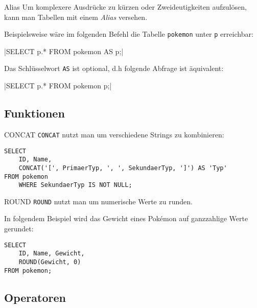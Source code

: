 \begin{bonus}{Alias}
    Um komplexere Ausdrücke zu kürzen oder Zweideutigkeiten aufzulösen, kann man Tabellen mit einem \emph{Alias} versehen.

    Beispielsweise wäre im folgenden Befehl die Tabelle \texttt{pokemon} unter \texttt{p} erreichbar:

    |SELECT p.* FROM pokemon AS p;|

    Das Schlüsselwort \texttt{AS} ist optional, d.h folgende Abfrage ist äquivalent:
    
    |SELECT p.* FROM pokemon p;|
\end{bonus}

\subsection{Funktionen}

\begin{bonus}{CONCAT}
    \texttt{CONCAT} nutzt man um verschiedene Strings zu kombinieren:

    \begin{verbatim}
SELECT
    ID, Name,
    CONCAT('[', PrimaerTyp, ', ', SekundaerTyp, ']') AS 'Typ'
FROM pokemon
    WHERE SekundaerTyp IS NOT NULL;
    \end{verbatim}

    
\end{bonus}

\begin{bonus}{ROUND}
    \texttt{ROUND} nutzt man um numerische Werte zu runden.

    In folgendem Beispiel wird das Gewicht eines Pokémon auf ganzzahlige Werte gerundet:

    \begin{verbatim}
SELECT
    ID, Name, Gewicht,
    ROUND(Gewicht, 0)
FROM pokemon;
    \end{verbatim}

    
\end{bonus}

\subsection{Operatoren}


